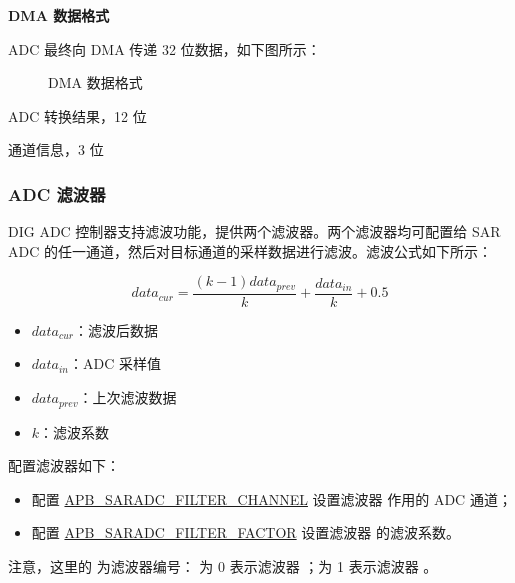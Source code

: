 \documentclass[main\_\_CN.tex]{subfiles}
\begin{document}
\textbf{DMA 数据格式}

ADC 最终向 DMA 传递 32 位数据，如下图所示：

\begin{figure}[H]
\centering
{}%
%
%
%
%
\end{figure}
\vspace{-2em}
\begin{figure}[H]
    \centering
    \caption{DMA 数据格式}
    \label{fig:sensor-dma-data-format}
\end{figure}
\vspace{-2em}
\begin{regdesc}\begin{reglist}
\item [data] ADC 转换结果，12 位
\item [ch\_sel] 通道信息，3 位
\end{reglist}\end{regdesc}


\subsubsection{ADC 滤波器}
DIG ADC 控制器支持滤波功能，提供两个滤波器。两个滤波器均可配置给 SAR ADC 的任一通道，然后对目标通道的采样数据进行滤波。滤波公式如下所示：


\[data_{cur} = \frac{(k-1)data_{prev}}{k}+\frac{data_{in}}{k}+0.5\]

\begin{itemize}
    \item \(data_{cur}\)：滤波后数据
    \item \(data_{in}\)：ADC 采样值
    \item \(data_{prev}\)：上次滤波数据
    \item \(k\)：滤波系数
\end{itemize}

配置滤波器如下：
\begin{itemize}
\item 配置 \hyperref[fielddesc:APBSARADCFILTERCHANNEL1]{APB\_SARADC\_FILTER\_CHANNEL}  设置滤波器  作用的 ADC 通道；
\item 配置 \hyperref[fielddesc:APBSARADCFILTERCHANNEL1]{APB\_SARADC\_FILTER\_FACTOR} 设置滤波器  的滤波系数。
\end{itemize}

注意，这里的  为滤波器编号： 为 0 表示滤波器 ；为 1 表示滤波器 。
\end{document}
